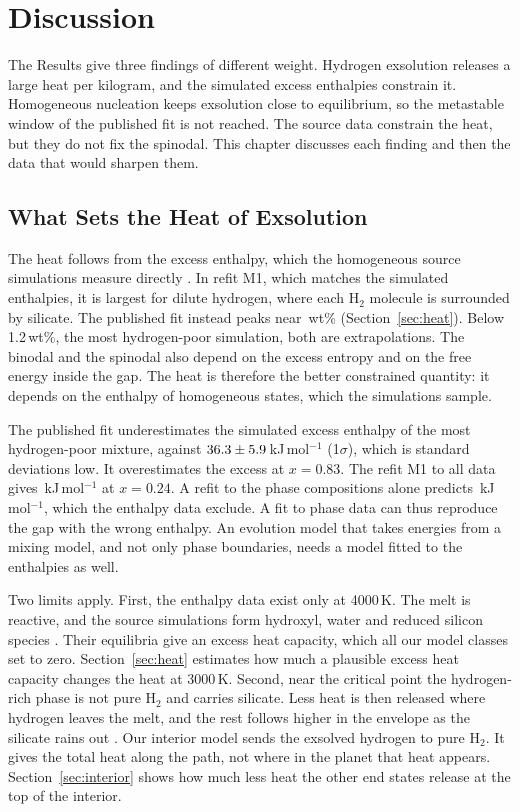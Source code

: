 \chapter{Discussion}\label{ch:discussion}

The Results give three findings of different weight. Hydrogen exsolution releases a large heat
per kilogram, and the simulated excess enthalpies constrain it. Homogeneous nucleation keeps
exsolution close to equilibrium, so the metastable window of the published fit is not reached.
The source data constrain the heat, but they do not fix the spinodal. This chapter discusses
each finding and then the data that would sharpen them.

\section{What Sets the Heat of Exsolution}\label{sec:heat_discussion}

The heat follows from the excess enthalpy, which the homogeneous source simulations measure
directly \cite{gilmore2026data}. In refit M1, which matches the simulated enthalpies, it is
largest for dilute hydrogen, where each H$_2$ molecule is surrounded by silicate. The published
fit instead peaks near \pubThreshold{}\,wt\% (Section~\ref{sec:heat}). Below 1.2\,wt\%, the most
hydrogen-poor simulation, both are extrapolations. The binodal and the spinodal also depend on the
excess entropy and on the free energy inside the gap. The heat is therefore the better
constrained quantity: it depends on the enthalpy of homogeneous states, which the simulations
sample.

The published fit underestimates the simulated excess enthalpy of the most hydrogen-poor
mixture, \edHexPub{} against $36.3\pm5.9$\,kJ\,mol$^{-1}$ (1$\sigma$), which is
\edHexPull{} standard deviations low. It overestimates the excess at $x = 0.83$. The refit M1 to
all data gives \edHexMOne{}\,kJ\,mol$^{-1}$ at $x = 0.24$. A refit to the phase compositions alone predicts
\edHexPhaseComp{}\,kJ\,mol$^{-1}$, which the enthalpy data exclude. A fit to phase data can thus
reproduce the gap with the wrong enthalpy. An evolution model that takes energies from a mixing
model, and not only phase boundaries, needs a model fitted to the enthalpies as well.

Two limits apply. First, the enthalpy data exist only at 4000\,K. The melt is reactive, and the
source simulations form hydroxyl, water and reduced silicon species \cite{gilmore2026}. Their
equilibria give an excess heat capacity, which all our model classes set to zero.
Section~\ref{sec:heat} estimates how much a plausible excess heat capacity changes the heat at
3000\,K. Second, near the critical point the hydrogen-rich phase is not pure H$_2$ and carries
silicate. Less heat is then released where hydrogen leaves the melt, and the rest follows higher
in the envelope as the silicate rains out \cite{tejada2026}. Our interior model sends the
exsolved hydrogen to pure H$_2$. It gives the total heat along the path, not where in the planet
that heat appears. Section~\ref{sec:interior} shows how much less heat the other end states
release at the top of the interior.

